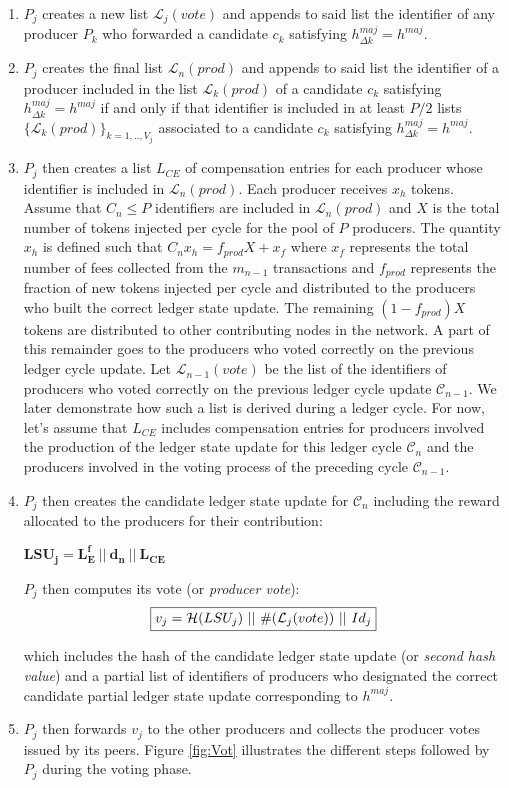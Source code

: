 \documentclass{article}
\begin{document}
\begin{enumerate}
\item $P_j$ creates a new list $\mathcal{L}_j(vote)$ and appends to said list the identifier of any producer $P_k$ who forwarded a candidate $c_k$ satisfying $h^{maj}_{\Delta k} = h^{maj}$.
\item $P_j$ creates the final list $\mathcal{L}_n(prod)$ and appends to said list the identifier of a producer included in the list $\mathcal{L}_k(prod)$ of a candidate $c_k$ satisfying $h^{maj}_{\Delta k} = h^{maj}$ if and only if that identifier is included in at least $P/2$ lists $\{\mathcal{L}_{k}(prod)\}_{k=1,..,V_j}$ associated to a candidate $c_{k}$ satisfying $h^{maj}_{\Delta k} = h^{maj}$. 
\item $P_j$ then creates a list $L_{CE}$ of compensation entries for each producer whose identifier is included in $\mathcal{L}_n(prod)$. Each producer receives $x_h$ tokens. Assume that $ C_n \leq P$ identifiers are included in $\mathcal{L}_n(prod)$ and $X$ is the total number of tokens injected per cycle for the pool of $P$ producers. The quantity $x_h$ is defined such that $ C_nx_h = f_{prod}X + x_f$ where $x_f$ represents the total number of fees collected from the $m_{n-1}$ transactions and $f_{prod}$ represents the fraction of new tokens injected per cycle and distributed to the producers who built the correct ledger state update. The remaining $(1-f_{prod})X$ tokens are distributed to other contributing nodes in the network. A part of this remainder goes to the producers who voted correctly on the previous ledger cycle update. Let $\mathcal{L}_{n-1}(vote)$ be the list of the identifiers of producers who voted correctly on the previous ledger cycle update $\mathcal{C}_{n-1}$. We later demonstrate how such a list is derived during a ledger cycle. For now, let's assume that $L_{CE}$ includes compensation entries for producers involved the production of the ledger state update for this ledger cycle $\mathcal{C}_n$ and the producers involved in the voting process of the preceding cycle $\mathcal{C}_{n-1}$. 
\item $P_j$ then creates the candidate ledger state update for $\mathcal{C}_n$ including the reward allocated to the producers for their contribution:
\begin{center}
$\mathbf{LSU_j = L^f_E~||~d_n~||~L_{CE}}$
\end{center}
$P_j$ then computes its vote (or \textit{producer vote}):
\begin{equation}
\label{eq:vj}
\fbox{$v_j = \mathcal{H}(LSU_j)~||~\#(\mathcal{L}_j(vote))~||~Id_j$}
\end{equation}

which includes the hash of the candidate ledger state update (or \textit{second hash value}) and a partial list of identifiers of producers who designated the correct candidate partial ledger state update corresponding to $h^{maj}$. 

\item $P_j$ then forwards $v_j$ to the other producers and collects the producer votes issued by its peers. Figure \ref{fig:Vot} illustrates the different steps followed by $P_j$ during the voting phase.

\end{enumerate}
\end{document}
